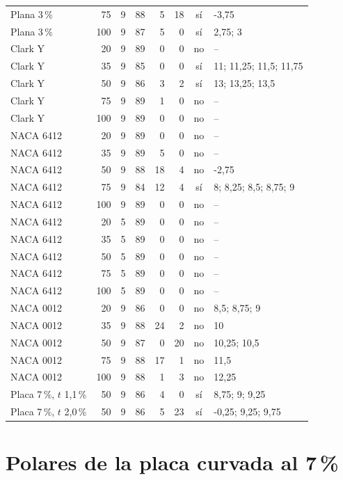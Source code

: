 {\begin{longtable}{@{}lrrrrrcl@{}}
Plana 3\,\% & 75 & 9 & 88 & 5 & 18 & sí & -3,75\\
Plana 3\,\% & 100 & 9 & 87 & 5 & 0 & sí & 2,75; 3\\
\addlinespace[2pt]
Clark Y & 20 & 9 & 89 & 0 & 0 & no & --\\
Clark Y & 35 & 9 & 85 & 0 & 0 & sí & 11; 11,25; 11,5; 11,75\\
Clark Y & 50 & 9 & 86 & 3 & 2 & sí & 13; 13,25; 13,5\\
Clark Y & 75 & 9 & 89 & 1 & 0 & no & --\\
Clark Y & 100 & 9 & 89 & 0 & 0 & no & --\\
\addlinespace[2pt]
NACA 6412 & 20 & 9 & 89 & 0 & 0 & no & --\\
NACA 6412 & 35 & 9 & 89 & 5 & 0 & no & --\\
NACA 6412 & 50 & 9 & 88 & 18 & 4 & no & -2,75\\
NACA 6412 & 75 & 9 & 84 & 12 & 4 & sí & 8; 8,25; 8,5; 8,75; 9\\
NACA 6412 & 100 & 9 & 89 & 0 & 0 & no & --\\
\addlinespace[2pt]
NACA 6412 & 20 & 5 & 89 & 0 & 0 & no & --\\
NACA 6412 & 35 & 5 & 89 & 0 & 0 & no & --\\
NACA 6412 & 50 & 5 & 89 & 0 & 0 & no & --\\
NACA 6412 & 75 & 5 & 89 & 0 & 0 & no & --\\
NACA 6412 & 100 & 5 & 89 & 0 & 0 & no & --\\
\addlinespace[2pt]
NACA 0012 & 20 & 9 & 86 & 0 & 0 & no & 8,5; 8,75; 9\\
NACA 0012 & 35 & 9 & 88 & 24 & 2 & no & 10\\
NACA 0012 & 50 & 9 & 87 & 0 & 20 & no & 10,25; 10,5\\
NACA 0012 & 75 & 9 & 88 & 17 & 1 & no & 11,5\\
NACA 0012 & 100 & 9 & 88 & 1 & 3 & no & 12,25\\
\addlinespace[2pt]
Placa 7\,\%, $t$ 1,1\,\% & 50 & 9 & 86 & 4 & 0 & sí & 8,75; 9; 9,25\\
\addlinespace[2pt]
Placa 7\,\%, $t$ 2,0\,\% & 50 & 9 & 86 & 5 & 23 & sí & -0,25; 9,25; 9,75\\
\bottomrule
\end{longtable}
}

\section{Polares de la placa curvada al 7\,\%}\label{sec:polares-placa7}

